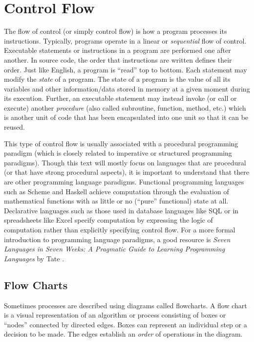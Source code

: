 

\section{Control Flow}

The flow of control (or simply control flow) is how a program processes its instructions.
Typically, programs operate in a linear or \emph{sequential} flow of control.  Executable
statements or instructions in a program are performed one after another.  In source code, 
the order that instructions are written defines their order.  Just like English, a program
is ``read'' top to bottom.  Each statement may modify the \emph{state} of a program.  
The state of a program is the value of all its variables and other information/data stored 
in memory at a given moment during its execution.  Further, an executable statement
may instead invoke (or call or execute) another \emph{procedure} (also called 
subroutine, function, method, etc.) which is another unit of code that has been 
encapsulated into one unit so that it can be reused.

This type of control flow is usually associated with a procedural programming paradigm
(which is closely related to imperative or structured programming paradigms).  
Though this text will mostly focus on languages that are procedural (or that have
strong procedural aspects), it is important to understand that there are other 
programming language paradigms.  Functional programming languages such as
Scheme and Haskell achieve computation through the evaluation of mathematical 
functions with as little or no (``pure'' functional) state at all.  Declarative languages
such as those used in database languages like SQL or in spreadsheets like Excel
specify computation by expressing the logic of computation rather than explicitly 
specifying control flow.  For a more formal introduction to programming language 
paradigms, a good resource is \emph{Seven Languages in Seven Weeks: A Pragmatic Guide to Learning Programming Languages}
by Tate \cite{Tate:2010:SLS:1951955}.

\subsection{Flow Charts}

Sometimes processes are described using diagrams called \glspl{flowchart}.
A flow chart is a visual representation of an \gls{algorithm} or process consisting
of boxes or ``nodes'' connected by directed edges.  Boxes can represent an individual 
step or a decision to be made.  The edges establish an \emph{order} of operations
in the diagram.  

